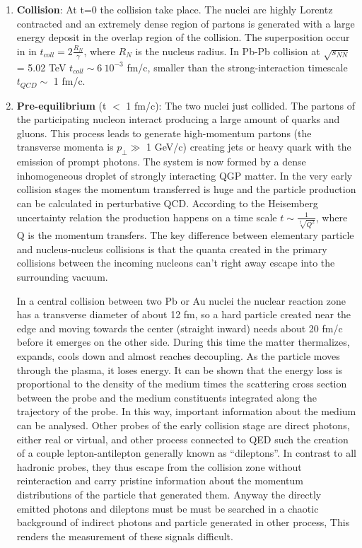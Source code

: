 \documentclass[12pt,a4paper]{book}
\begin{document}
	\begin{enumerate}
		\item \textbf{Collision}: At t=0 the collision take place. The nuclei are highly Lorentz contracted and an extremely dense region of partons is generated with a large energy deposit in the overlap region of the collision. The superposition occur in in $t_{coll} = 2 \frac{R_N}{\gamma}$, where $R_N$ is the nucleus radius. In Pb-Pb collision at $\sqrt{s_{NN}}$ = 5.02 TeV $t_{coll} \sim 6 \ 10^{-3}$ fm/c, smaller than the strong-interaction timescale $t_{QCD}\sim$ 1 fm/c. 
		\item \textbf{Pre-equilibrium} (t $<$ 1 fm/c): The two nuclei just collided. The partons of the participating nucleon interact producing a large amount of quarks and gluons. This process leads to generate high-momentum partons (the transverse momenta is $p_\perp \gg$ 1 GeV/c) creating jets or heavy quark with the emission of prompt photons. The system is now formed by a dense inhomogeneous droplet of strongly interacting QGP matter. In the very early collision stages the momentum transferred is huge and the particle production can be calculated in perturbative QCD. According to the Heisemberg uncertainty relation the production happens on a time scale $t \sim \frac{1}{\sqrt[2]{Q^2}}$, where Q is the momentum transfers. The key difference between elementary particle and nucleus-nucleus collisions is that the quanta created in the primary collisions between the incoming nucleons can’t right away escape into the surrounding vacuum. 
		
		In a central collision between two Pb or Au nuclei the nuclear reaction zone has a transverse diameter of about 12 fm, so a hard particle created near the edge and moving towards the center (straight inward) needs about 20 fm/c before it emerges on the other side. During this time the matter thermalizes, expands, cools down and almost reaches decoupling. As the particle moves through the plasma, it loses energy. It can be shown that the energy loss is proportional to the density of the medium times the scattering cross section between the probe and the medium constituents integrated along the trajectory of the probe. In this way, important information about the medium can be analysed. Other probes of the early collision stage are direct photons, either real or virtual, and other process connected to QED such the creation of a couple lepton-antilepton generally known as “dileptons”.  In contrast to all hadronic probes, they thus escape from the collision zone without reinteraction and carry pristine information about the momentum distributions of the particle that generated them. Anyway the directly emitted photons and dileptons must be must be searched in a chaotic background of indirect photons and particle generated in other process, This renders the measurement of these signals difficult. 
		

\end{enumerate}
\end{document}
